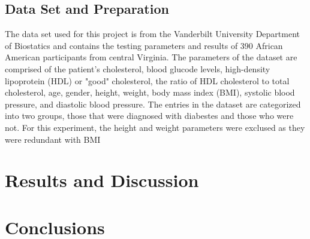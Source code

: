 \documentclass[12pt]{article}
\begin{document}
    \subsection{Data Set and Preparation}
        The data set used for this project is from the Vanderbilt University Department of Biostatics and contains
        the testing parameters and results of 390 African American participants from central Virginia.
        The parameters of the dataset are comprised of the patient's cholesterol, blood glucode levels, high-density lipoprotein (HDL)
        or "good" cholesterol, the ratio of HDL cholesterol to total cholesterol, age, gender, height, weight, body mass index (BMI),
        systolic blood pressure, and diastolic blood pressure.  The entries in the dataset are categorized into two groups, those that
        were diagnosed with diabestes and those who were not.  For this experiment, the height and weight parameters were exclused
        as they were redundant with BMI %

\section{Results and Discussion}

\section{Conclusions}

\begin{thebibliography}{100}
\end{thebibliography}
\end{document}
